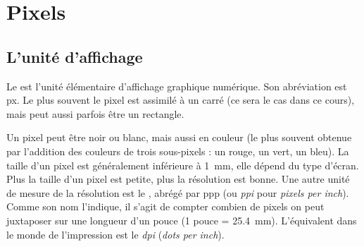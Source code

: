 \documentclass[11pt,class=report,crop=false]{standalone}
\begin{document}










\section{Pixels}


\subsection{L'unité d'affichage}

Le  est l'unité élémentaire d'affichage graphique numérique.
Son abréviation est \og{}px\fg{}. Le plus souvent le pixel est assimilé à un carré (ce sera le cas dans ce cours), mais peut aussi parfois être un rectangle.


Un pixel peut être noir ou blanc, mais aussi en couleur (le plus souvent obtenue par l'addition des couleurs de trois sous-pixels : un rouge, un vert, un bleu).
La taille d'un pixel est généralement inférieure à \SI{1}{mm}, elle dépend du type d'écran.
Plus la taille d'un pixel est petite, plus la résolution est bonne.
Une autre unité de mesure de la résolution est le , abrégé par  \og{}ppp\fg{} (ou \emph{ppi} pour \emph{pixels per inch}).
Comme son nom l'indique, il s'agit de compter combien de pixels on peut juxtaposer sur une longueur d'un pouce (1 pouce = \SI{25.4}{mm}).
L'équivalent dans le monde de l'impression est le \emph{dpi} (\emph{dots per inch}).
\end{document}
